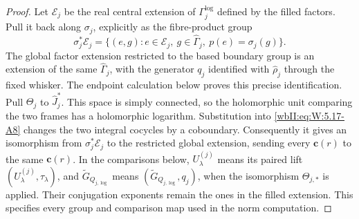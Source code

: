 \begin{proof}
Let \(\mathscr E_j\) be the real central extension of
\(\Gamma_j^{\log}\) defined by the filled factors.  Pull it back along
\(\sigma_j\), explicitly as the fibre-product group
\[
 \sigma_j^*\mathscr E_j=
 \{(e,g):e\in\mathscr E_j,\ g\in\widehat\Gamma_j,
           \ p(e)=\sigma_j(g)\}.
\]
The global factor extension restricted to the based boundary group is
an extension of the same \(\widehat\Gamma_j\), with the generator
\(q_j\) identified with \(\widehat\rho_j\) through the fixed whisker.
The endpoint calculation below proves this precise identification.
Pull \(\Theta_j\) to \(\widehat J_j^*\).  This space is simply
connected, so the holomorphic unit comparing the two frames has a
holomorphic logarithm.  Substitution into \eqref{wbII:eq:W:5.17-A8}
changes the two integral cocycles by a coboundary.  Consequently it gives
an isomorphism from \(\sigma_j^*\mathscr E_j\) to the restricted global
extension, sending every \(\mathbf c(r)\) to the same
\(\mathbf c(r)\).  In the comparisons below,
\(U_\lambda^{(j)}\) means its paired lift
\((U_\lambda^{(j)},\tau_\lambda)\), and
\(\widetilde G_{Q_{j,\log}}\) means
\((\widetilde G_{Q_{j,\log}},q_j)\), when the isomorphism
\(\Theta_{j,*}\) is applied.  Their conjugation exponents remain the
ones in the filled extension.  This specifies every group and comparison
map used in the norm computation.


\end{proof}
